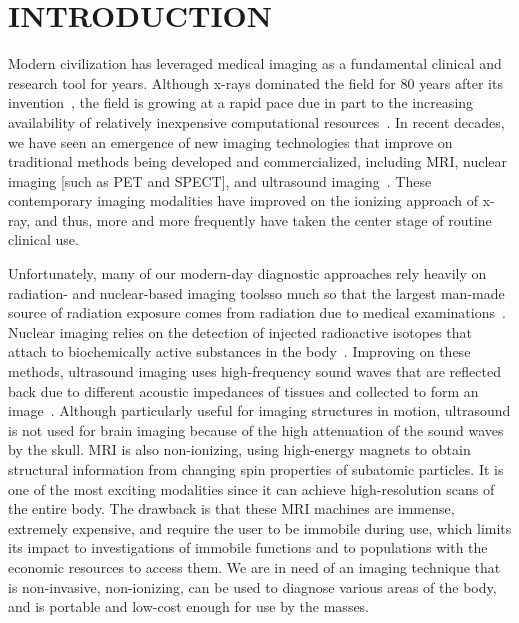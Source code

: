 
\chapter{INTRODUCTION} %
\label{chap:introduction}

Modern civilization has leveraged medical imaging as a fundamental clinical and research tool for years. Although x-rays dominated the field for 80 years after its invention~\cite{Gunderman2012}, the field is growing at a rapid pace due in part to the increasing availability of relatively inexpensive computational resources~\cite{Iglehart2006}. In recent decades, we have seen an emergence of new imaging technologies that improve on traditional methods being developed and commercialized, including \ac{MRI}, nuclear imaging [such as \ac{PET} and \ac{SPECT}], and ultrasound imaging~\cite{Suetens2017}. These contemporary imaging modalities have improved on the ionizing approach of x-ray, and thus, more and more frequently have taken the center stage of routine clinical use. 

Unfortunately, many of our modern-day diagnostic approaches rely heavily on radiation- and nuclear-based imaging tools\textemdash so much so that the largest man-made source of radiation exposure comes from radiation due to medical examinations~\cite{Picano2004}. Nuclear imaging relies on the detection of injected radioactive isotopes that attach to biochemically active substances in the body~\cite{Fahey2002}. Improving on these methods, ultrasound imaging uses high-frequency sound waves that are reflected back due to different acoustic impedances of tissues and collected to form an image~\cite{Chan2011}. Although particularly useful for imaging structures in motion, ultrasound is not used for brain imaging because of the high attenuation of the sound waves by the skull. \ac{MRI} is also non-ionizing, using high-energy magnets to obtain structural information from changing spin properties of subatomic particles\cite{Plewes2012}. It is one of the most exciting modalities since it can achieve high-resolution scans of the entire body. The drawback is that these \ac{MRI} machines are immense, extremely expensive, and require the user to be immobile during use, which limits its impact to investigations of immobile functions and to populations with the economic resources to access them. We are in need of an imaging technique that is non-invasive, non-ionizing, can be used to diagnose various areas of the body, and is portable and low-cost enough for use by the masses.

